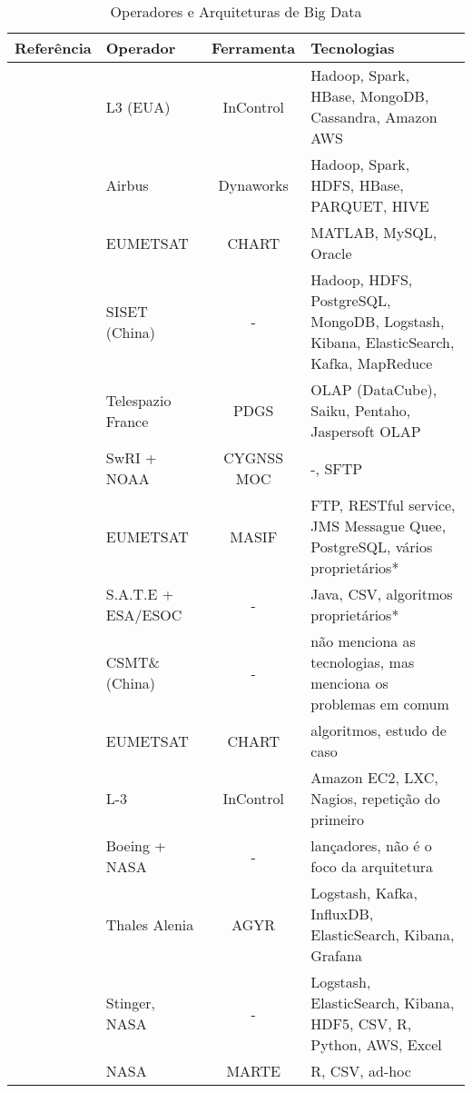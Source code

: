 \begin{table}[!ht]%
  \begin{center}
  \caption{Operadores e Arquiteturas de Big Data}
  \begin{tabular}{|m{8em}|m{6em}|c|m{10em}|}
			\hline
			Referência & Operador & Ferramenta & Tecnologias \\
			\hline
			\cite{adamskiDataAnalyticsLarge2016} & L3 (EUA) & InControl & Hadoop, Spark, HBase, MongoDB, Cassandra, Amazon AWS \\
			\hline
			\cite{boussoufBigDataBased2018} & Airbus & Dynaworks & Hadoop, Spark, HDFS, HBase, PARQUET, HIVE \\
			\hline
			\cite{schulsterCHARTingFutureOffline2018} & EUMETSAT & CHART & MATLAB, MySQL, Oracle \\
			\hline
			\cite{zhangBigDataFramework2017} & SISET (China) & - & Hadoop, HDFS, PostgreSQL, MongoDB, Logstash, Kibana, ElasticSearch, Kafka, MapReduce \\
			\hline
			\cite{yvernesCopernicusGroundSegment2018} & Telespazio France & PDGS & OLAP (DataCube), Saiku, Pentaho, Jaspersoft OLAP \\
			\hline
			\cite{dischnerCYGNSSMOCMeeting2016} & SwRI + NOAA & CYGNSS MOC & -, SFTP \\
			\hline
			\cite{edwardsDealingBigData2018} & EUMETSAT & MASIF & FTP, RESTful service, JMS Messague Quee, PostgreSQL, vários proprietários* \\
			\hline
			\cite{evansDataMiningDrastically2016} & S.A.T.E + ESA/ESOC & - & Java, CSV, algoritmos proprietários* \\
			\hline
			\cite{fenManagementOperationCommunication2016} & CSMT\& (China) & - & não menciona as tecnologias, mas menciona os problemas em comum \\
			\hline
			\cite{trollopeAnalysisAutomatedTechniques2018} & EUMETSAT & CHART & algoritmos, estudo de caso \\
			\hline
			\cite{gillesFlyingLargeConstellations2016} & L-3 & InControl & Amazon EC2, LXC, Nagios, repetição do primeiro \\
			\hline
			\cite{highsmithSpaceLaunchSystem2015} & Boeing + NASA & - & lançadores, não é o foco da arquitetura \\
			\hline
			\cite{hennionBigdataSatelliteYearly2018} & Thales Alenia & AGYR & Logstash, Kafka, InfluxDB, ElasticSearch, Kibana, Grafana \\
			\hline
			\cite{mateikUsingBigData2017} & Stinger, NASA & - & Logstash, ElasticSearch, Kibana, HDF5, CSV, R, Python, AWS, Excel \\
			\hline
			\cite{fernandezTelemetryAnomalyDetection2017} & NASA & MARTE & R, CSV, ad-hoc \\
			\hline
    \end{tabular}
    \end{center}
	\label{table:bigdataoperators}
\end{table}


